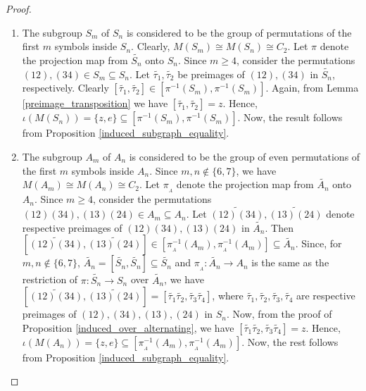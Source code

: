 \documentclass[12pt,a4paper]{article}
\begin{document}
\begin{proof}
\noindent
\begin{enumerate}[\rm (i)]
     \item The subgroup $S_m$ of $S_n$ is considered to be the group of permutations of the first $m$ symbols inside $S_n$. Clearly, $M(S_m)\cong M(S_n)\cong C_2$. Let $\pi$ denote the projection map from $\tilde{S_n}$ onto $S_n$. Since $m\geq 4$, consider the permutations $(12),(34)\in S_m\subseteq S_n$. Let $\tilde{\tau_1},\tilde{\tau_2}$ be preimages of $(12),(34)$ in $\tilde{S_n}$, respectively. Clearly $[\tilde{\tau_1},\tilde{\tau_2}]\in[\pi^{-1}(S_m),\pi^{-1}(S_m)]$. Again, from Lemma \ref{preimage_transposition} we have $[\tilde{\tau_1},\tilde{\tau_2}]=z.$ Hence, $\iota(M(S_n))=\{z,e\}\subseteq [\pi^{-1}(S_m),\pi^{-1}(S_m)]$. Now, the result follows from Proposition \ref{induced_subgraph_equality}.  
     
     \item The subgroup $A_m$ of $A_n$ is considered to be the group of even permutations of the first $m$ symbols inside $A_n$. Since $m,n\notin\{6,7\}$, we have $M(A_m)\cong M(A_n)\cong C_2$. Let $\pi_{_A}$ denote the projection map from $\tilde{A_n}$ onto $A_n$. Since $m\geq 4$, consider the permutations $(12)(34),(13)(24)\in A_m\subseteq A_n$. Let $\tilde{(12)(34)},\tilde{(13)(24)}$ denote respective preimages of $(12)(34),(13)(24)$ in $\tilde{A_n}$. Then $[\tilde{(12)(34)},\tilde{(13)(24)}]\in[\pi_{_A}^{-1}(A_m),\pi_{_A}^{-1}(A_m)]\subseteq\tilde{A_n}$. Since, for $m,n\notin\{6,7\}$, $\tilde{A_n}=[\tilde{S_n},\tilde{S_n}]\subseteq\tilde{S_n}$ and $\pi_{_A}:\tilde{A_n}\rightarrow A_n$ is the same as the restriction of $\pi:\tilde{S_n}\rightarrow S_n$ over $\tilde{A_n}$, we have $[\tilde{(12)(34)},\tilde{(13)(24)}]=[\tilde{\tau_1}\tilde{\tau_2},\tilde{\tau_3}\tilde{\tau_4}]$, where $\tilde{\tau_1},\tilde{\tau_2},\tilde{\tau_3},\tilde{\tau_4}$ are respective preimages of $(12),(34),(13),(24)$ in $S_n$. Now, from the proof of Proposition \ref{induced_over_alternating}, we have $[\tilde{\tau_1}\tilde{\tau_2},\tilde{\tau_3}\tilde{\tau_4}]=z.$ Hence, $\iota(M(A_n))=\{z,e\}\subseteq [\pi_{_A}^{-1}(A_m),\pi_{_A}^{-1}(A_m)]$. Now, the rest follows from Proposition \ref{induced_subgraph_equality}.


\end{enumerate}
\end{proof}
\end{document}
